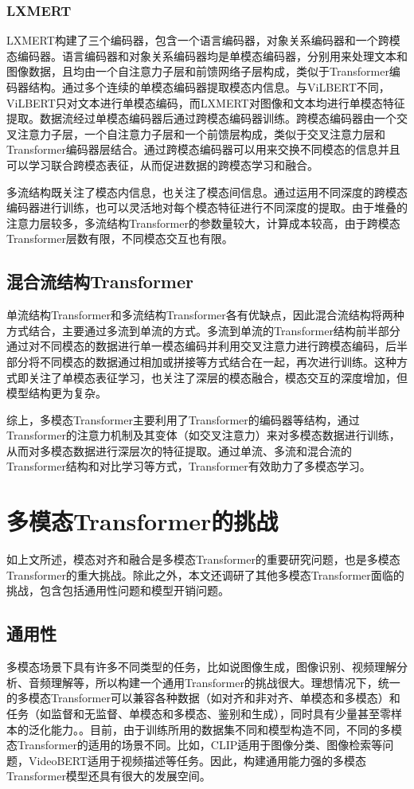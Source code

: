 \documentclass[journal]{IEEEtran}
\begin{document}
\subsubsection{LXMERT}
LXMERT\cite{tan2019lxmert}构建了三个编码器，包含一个语言编码器，对象关系编码器和一个跨模态编码器。语言编码器和对象关系编码器均是单模态编码器，分别用来处理文本和图像数据，且均由一个自注意力子层和前馈网络子层构成，类似于Transformer编码器结构。通过多个连续的单模态编码器提取模态内信息。与ViLBERT不同，ViLBERT只对文本进行单模态编码，而LXMERT对图像和文本均进行单模态特征提取。数据流经过单模态编码器后通过跨模态编码器训练。跨模态编码器由一个交叉注意力子层，一个自注意力子层和一个前馈层构成，类似于交叉注意力层和Transformer编码器层结合。通过跨模态编码器可以用来交换不同模态的信息并且可以学习联合跨模态表征，从而促进数据的跨模态学习和融合。

多流结构既关注了模态内信息，也关注了模态间信息。通过运用不同深度的跨模态编码器进行训练，也可以灵活地对每个模态特征进行不同深度的提取。由于堆叠的注意力层较多，多流结构Transformer的参数量较大，计算成本较高，由于跨模态Transformer层数有限，不同模态交互也有限。

\subsection{混合流结构Transformer}
单流结构Transformer和多流结构Transformer各有优缺点，因此混合流结构将两种方式结合，主要通过多流到单流的方式。多流到单流的Transformer结构前半部分通过对不同模态的数据进行单一模态编码并利用交叉注意力进行跨模态编码，后半部分将不同模态的数据通过相加或拼接等方式结合在一起，再次进行训练。这种方式即关注了单模态表征学习，也关注了深层的模态融合，模态交互的深度增加，但模型结构更为复杂。

综上，多模态Transformer主要利用了Transformer的编码器等结构，通过Transformer的注意力机制及其变体（如交叉注意力）来对多模态数据进行训练，从而对多模态数据进行深层次的特征提取。通过单流、多流和混合流的Transformer结构和对比学习等方式，Transformer有效助力了多模态学习。

\section{多模态Transformer的挑战}\label{challenge}

如上文所述，模态对齐和融合是多模态Transformer的重要研究问题，也是多模态Transformer的重大挑战。除此之外，本文还调研了其他多模态Transformer面临的挑战，包含包括通用性问题和模型开销问题。
\subsection{通用性} 多模态场景下具有许多不同类型的任务，比如说图像生成，图像识别、视频理解分析、音频理解等，所以构建一个通用Transformer的挑战很大。理想情况下，统一的多模态Transformer可以兼容各种数据（如对齐和非对齐、单模态和多模态）和任务（如监督和无监督、单模态和多模态、鉴别和生成），同时具有少量甚至零样本的泛化能力。\cite{10123038}。目前，由于训练所用的数据集不同和模型构造不同，不同的多模态Transformer的适用的场景不同。比如，CLIP适用于图像分类、图像检索等问题，VideoBERT适用于视频描述等任务。因此，构建通用能力强的多模态Transformer模型还具有很大的发展空间。
\end{document}
